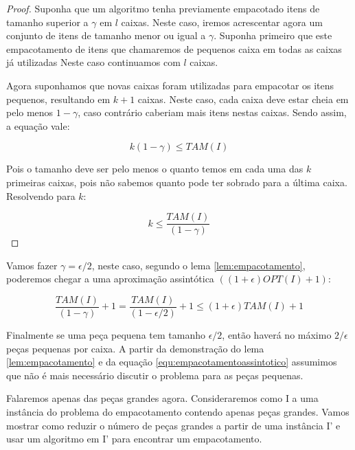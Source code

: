 \begin{proof}

Suponha que um algoritmo tenha previamente empacotado itens de tamanho superior a $\gamma$ em $l$ caixas. Neste caso, iremos acrescentar agora um conjunto de itens de tamanho menor ou igual a $\gamma$. Suponha primeiro que este empacotamento de itens que chamaremos de pequenos caixa em todas as caixas já utilizadas Neste caso continuamos com $l$ caixas.

Agora suponhamos que novas caixas foram utilizadas para empacotar os itens pequenos, resultando em $k+1$ caixas. Neste caso, cada caixa deve estar cheia em pelo menos $1-\gamma$, caso contrário caberiam mais itens nestas caixas. Sendo assim, a equação vale:

\begin{equation}
k(1-\gamma) \leq TAM(I) 
\end{equation}

Pois o tamanho deve ser pelo menos o quanto temos em cada uma das $k$ primeiras caixas, pois não sabemos quanto pode ter sobrado para a última caixa. Resolvendo para $k$:

\begin{equation}
k \leq \frac{TAM(I)}{(1-\gamma)} 
\end{equation}

\end{proof}

Vamos fazer $\gamma = \epsilon/2$, neste caso, segundo o lema \ref{lem:empacotamento}, poderemos chegar a uma aproximação assintótica $((1+\epsilon) OPT(I) + 1)$:

\begin{equation}
\label{equ:empacotamentoassintotico}
\frac{TAM(I)}{(1-\gamma)} + 1 = \frac{TAM(I)}{(1-\epsilon/2)} + 1 \leq (1+\epsilon) TAM(I) + 1
\end{equation}

Finalmente se uma peça pequena tem tamanho $\epsilon/2$, então haverá no máximo $2/\epsilon$ peças pequenas por caixa. A partir da demonstração do lema \ref{lem:empacotamento} e da equação \ref{equ:empacotamentoassintotico} assumimos que não é mais necessário discutir o problema para as peças pequenas.

Falaremos apenas das peças grandes agora. Consideraremos como I a uma instância do problema do empacotamento contendo apenas peças grandes. Vamos mostrar como reduzir o número de peças grandes a partir de uma instância I' e usar um algoritmo em I' para encontrar um empacotamento.

